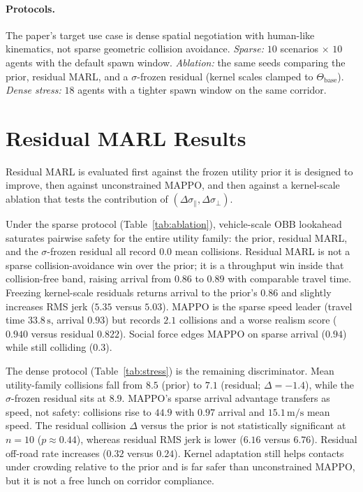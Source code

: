 \documentclass[conference]{IEEEtran}
\begin{document}
\paragraph{Protocols.}
The paper's target use case is dense spatial negotiation with human-like kinematics, not sparse geometric collision avoidance. \emph{Sparse:} $10$ scenarios $\times$ $10$ agents with the default spawn window. \emph{Ablation:} the same seeds comparing the prior, residual MARL, and a $\sigma$-frozen residual (kernel scales clamped to $\Theta_{\mathrm{base}}$). \emph{Dense stress:} $18$ agents with a tighter spawn window on the same corridor.

\section{Residual MARL Results}
\label{sec:residual_results}

Residual MARL is evaluated first against the frozen utility prior it is designed to improve, then against unconstrained MAPPO, and then against a kernel-scale ablation that tests the contribution of $(\Delta\sigma_{\parallel},\Delta\sigma_{\perp})$.

Under the sparse protocol (Table~\ref{tab:ablation}), vehicle-scale OBB lookahead saturates pairwise safety for the entire utility family: the prior, residual MARL, and the $\sigma$-frozen residual all record $0.0$ mean collisions. Residual MARL is not a sparse collision-avoidance win over the prior; it is a throughput win inside that collision-free band, raising arrival from $0.86$ to $0.89$ with comparable travel time. Freezing kernel-scale residuals returns arrival to the prior's $0.86$ and slightly increases RMS jerk ($5.35$ versus $5.03$). MAPPO is the sparse speed leader (travel time $33.8\,\mathrm{s}$, arrival $0.93$) but records $2.1$ collisions and a worse realism score ($0.940$ versus residual $0.822$). Social force edges MAPPO on sparse arrival ($0.94$) while still colliding ($0.3$).

The dense protocol (Table~\ref{tab:stress}) is the remaining discriminator. Mean utility-family collisions fall from $8.5$ (prior) to $7.1$ (residual; $\Delta=-1.4$), while the $\sigma$-frozen residual sits at $8.9$. MAPPO's sparse arrival advantage transfers as speed, not safety: collisions rise to $44.9$ with $0.97$ arrival and $15.1\,\mathrm{m/s}$ mean speed. The residual collision $\Delta$ versus the prior is not statistically significant at $n=10$ ($p\approx 0.44$), whereas residual RMS jerk is lower ($6.16$ versus $6.76$). Residual off-road rate increases ($0.32$ versus $0.24$). Kernel adaptation still helps contacts under crowding relative to the prior and is far safer than unconstrained MAPPO, but it is not a free lunch on corridor compliance.
\end{document}
